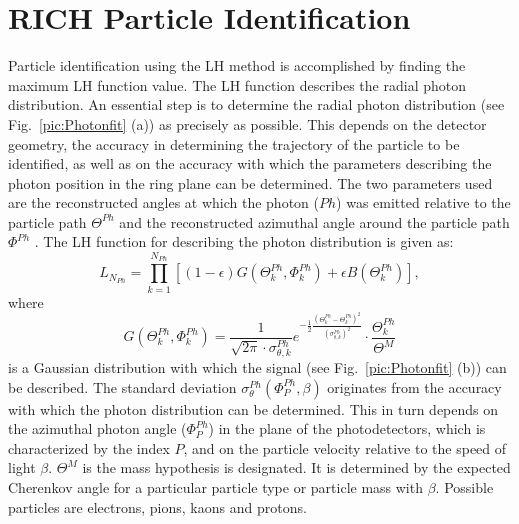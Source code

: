 \section{RICH Particle Identification}

Particle identification using the LH method is accomplished by finding the maximum LH function value. The LH function describes the radial photon distribution. An essential step is to determine the radial photon distribution (see Fig.~\ref{pic:Photonfit} (a)) as precisely as possible. This depends on the detector geometry, the accuracy in determining the trajectory of the particle to be identified, as well as on the accuracy with which the parameters describing the photon position in the ring plane can be determined. The two parameters used are the reconstructed angles at which the photon ($Ph$) was emitted relative to the particle path $\Theta^{Ph}$ and the reconstructed azimuthal angle around the particle path $\Phi^{Ph}$ \cite{Pfit1,Pfit2,Pfit3}. The LH function for describing the photon distribution is given as:
%
\begin{equation}
  L_{N_{Ph}} = \prod_{k=1}^{N_{Ph}} \left[ (1-\epsilon) G\left(\Theta_k^{Ph},\Phi_k^{Ph} \right) + \epsilon B\left(\Theta_k^{Ph} \right) \right],
\end{equation}
%
where
%
\begin{equation}
  G\left(\Theta_k^{Ph},\Phi_k^{Ph} \right) = \frac{1}{\sqrt{2\pi} \cdot \sigma_{\theta,k}^{Ph}} e^{-\frac{1}{2}\frac{\left(\Theta_k^{Ph}-\Theta_k^{Ph} \right)^2}{\left(\sigma_{\theta,k}^{Ph} \right)^2}} \cdot \frac{\Theta_k^{Ph}}{\Theta^{M}}
\end{equation}
%
is a Gaussian distribution with which the signal (see Fig.~\ref{pic:Photonfit} (b)) can be described. The standard deviation $\sigma_{\theta}^{Ph}(\Phi_P^{Ph},\beta)$ originates from the accuracy with which the photon distribution can be determined. This in turn depends on the azimuthal photon angle ($\Phi_P^{Ph}$) in the plane of the photodetectors, which is characterized by the index $P$, and on the particle velocity relative to the speed of light $\beta$. $\Theta^M$ is the mass hypothesis is designated. It is determined by the expected Cherenkov angle for a particular particle type or particle mass with $\beta$. Possible particles are electrons, pions, kaons and protons.

